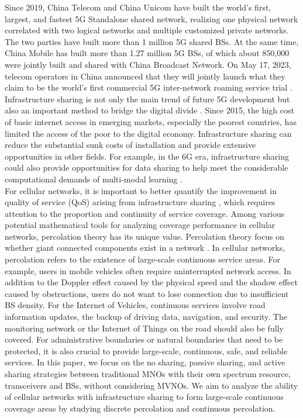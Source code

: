 \documentclass[final]{IEEEtran}
\begin{document}
\indent Since 2019, China Telecom and China Unicom have built the world's first, largest, and fastest 5G Standalone shared network, realizing one physical network correlated with two logical networks and multiple customized private networks. The two parties have built more than 1 million 5G shared BSs. At the same time, China Mobile has built more than 1.27 million 5G BSs, of which about 850,000 were jointly built and shared with China Broadcast Network. On May 17, 2023, telecom operators in China announced that they will jointly launch what they claim to be the world’s first commercial 5G inter-network roaming service trial \cite{5Groaming}. Infrastructure sharing is not only the main trend of future 5G development but also an important method to bridge the digital divide \cite{chaoub20216g}. Since 2015, the high cost of basic internet access in emerging markets, especially the poorest countries, has limited the access of the poor to the digital economy. Infrastructure sharing can reduce the substantial sunk costs of installation and provide extensive opportunities in other fields. For example, in the 6G era, infrastructure sharing could also provide opportunities for data sharing to help meet the considerable computational demands of multi-modal learning \cite{du2024distributed}.\\
\indent For cellular networks, it is important to better quantify the improvement in quality of service (QoS) arising from infrastructure sharing \cite{10077468}, which requires attention to the proportion and continuity of service coverage. Among various potential mathematical tools for analyzing coverage performance in cellular networks, percolation theory has its unique value. Percolation theory focus on whether giant connected components exist in a network \cite{Percolation,haenggi2012stochastic}. In cellular networks, percolation refers to the existence of large-scale continuous service areas. For example, users in mobile vehicles often require uninterrupted network access. In addition to the Doppler effect caused by the physical speed and the shadow effect caused by obstructions, users do not want to lose connection due to insufficient BS density. For the Internet of Vehicles, continuous services involve road information updates, the backup of driving data, navigation, and security. The monitoring network or the Internet of Things on the road should also be fully covered. For administrative boundaries or natural boundaries that need to be protected, it is also crucial to provide large-scale, continuous, safe, and reliable services. In this paper, we focus on the no sharing, passive sharing, and active sharing strategies between traditional MNOs with their own spectrum resource, transceivers and BSs, without considering MVNOs. We aim to analyze the ability of cellular networks with infrastructure sharing to form large-scale continuous coverage areas by studying discrete percolation and continuous percolation.
\end{document}
